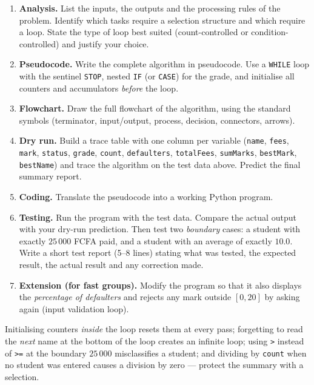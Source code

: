 \documentclass[11pt]{article}
\newcounter{popsec}
\newcounter{popsub}
\newcommand{\courssub}[1]{%
  \stepcounter{popsub}%
  \par\vspace{9pt}\noindent{\popxbold\fontsize{11.5}{13}\selectfont\color{popink}{\color{poporange}\thepopsec.\thepopsub}\hspace{6pt}#1}\par\nopagebreak\vspace{4pt}
}
\begin{document}
\courssub{Tasks}

\begin{enumerate}
\item \textbf{Analysis.} List the inputs, the outputs and the processing rules of the problem. Identify which tasks require a selection structure and which require a loop. State the type of loop best suited (count-controlled or condition-controlled) and justify your choice.
\item \textbf{Pseudocode.} Write the complete algorithm in pseudocode. Use a \texttt{WHILE} loop with the sentinel \texttt{STOP}, nested \texttt{IF} (or \texttt{CASE}) for the grade, and initialise all counters and accumulators \emph{before} the loop.
\item \textbf{Flowchart.} Draw the full flowchart of the algorithm, using the standard symbols (terminator, input/output, process, decision, connectors, arrows).
\item \textbf{Dry run.} Build a trace table with one column per variable (\texttt{name}, \texttt{fees}, \texttt{mark}, \texttt{status}, \texttt{grade}, \texttt{count}, \texttt{defaulters}, \texttt{totalFees}, \texttt{sumMarks}, \texttt{bestMark}, \texttt{bestName}) and trace the algorithm on the test data above. Predict the final summary report.
\item \textbf{Coding.} Translate the pseudocode into a working Python program.
\item \textbf{Testing.} Run the program with the test data. Compare the actual output with your dry-run prediction. Then test two \emph{boundary} cases: a student with exactly $25\,000$ FCFA paid, and a student with an average of exactly $10.0$. Write a short test report (5--8 lines) stating what was tested, the expected result, the actual result and any correction made.
\item \textbf{Extension (for fast groups).} Modify the program so that it also displays the \emph{percentage of defaulters} and rejects any mark outside $[0,20]$ by asking again (input validation loop).
\end{enumerate}

\begin{attention}
Initialising counters \emph{inside} the loop resets them at every pass; forgetting to read the \emph{next} name at the bottom of the loop creates an infinite loop; using \texttt{>} instead of \texttt{>=} at the boundary $25\,000$ misclassifies a student; and dividing by \texttt{count} when no student was entered causes a division by zero --- protect the summary with a selection.
\end{attention}
\end{document}
